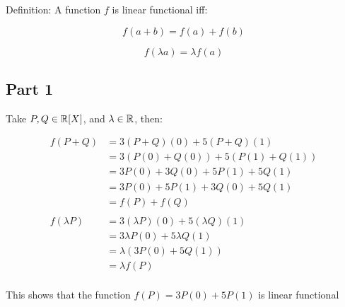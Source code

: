 \documentclass[12pt]{article} %
\begin{document}
\begin{homeworkProblem}

    Definition: A function $f$ is linear functional iff:

    $$
        f(a + b) = f(a) + f(b)
    $$

    $$
        f(\lambda a) = \lambda f(a)
    $$

    \subsection*{Part 1}

    Take $P, Q \in \mathbb{R}[X]$, and $\lambda \in \mathbb{R}$, then:

    \begin{align*}
        f(P + Q)
         & = 3(P + Q)(0) + 5(P + Q)(1)         \\
         & = 3(P(0) + Q(0)) + 5(P(1) + Q(1))   \\
         & = 3P(0) + 3Q(0) + 5P(1) + 5Q(1)     \\
         & = 3P(0) + 5P(1) + 3Q(0) + 5Q(1)     \\
         & = f(P) +f(Q)                        \\ \\
        f(\lambda P)
         & = 3(\lambda P)(0) + 5(\lambda Q)(1) \\
         & = 3\lambda P(0) + 5 \lambda Q(1)    \\
         & = \lambda (3P(0) + 5Q(1))           \\
         & = \lambda f(P)                      \\
    \end{align*}

    This shows that the function $f(P) = 3P(0) + 5P(1)$ is linear functional



\end{homeworkProblem}
\end{document}

